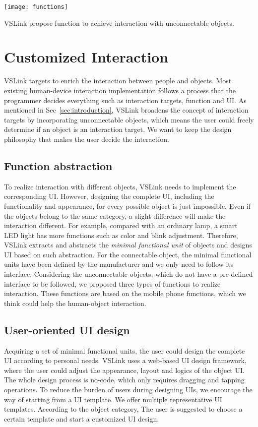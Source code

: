 \begin{table}[t]
	\centering
	\texttt{[image: functions]}
	\caption{VSLink propose function to achieve interaction with unconnectable objects.}
	\label{table:functions}
\end{table}

\section{Customized Interaction}\label{sec:flexible}
VSLink targets to enrich the interaction between people and objects.
Most existing human-device interaction implementation follows a process that the programmer decides everything such as interaction targets, function and UI.
As mentioned in Sec~\ref{sec:introduction}, VSLink broadens the concept of interaction targets by incorporating unconnectable objects, which means the user could freely determine if an object is an interaction target. 
We want to keep the design philosophy that makes the user decide the interaction.     

\subsection{Function abstraction}
To realize interaction with different objects, VSLink needs to implement the corresponding UI.  
However, designing the complete UI, including the functionality and appearance, for every possible object is just impossible.
Even if the objects belong to the same category, a slight difference will make the interaction different.
For example, compared with an ordinary lamp, a smart LED light has more functions such as color and blink adjustment.
Therefore, VSLink extracts and abstracts the \textit{minimal functional unit} of objects and designs UI based on such abstraction.
For the connectable object, the minimal functional units have been defined by the manufacturer and we only need to follow its interface.
Considering the unconnectable objects, which do not have a pre-defined interface to be followed, we proposed three types of functions to realize interaction.
These functions are based on the mobile phone functions, which we think could help the human-object interaction. 
% 
 
\subsection{User-oriented UI design}
Acquiring a set of minimal functional units, the user could design the complete UI according to personal needs.
VSLink uses a web-based UI design framework, where the user could adjust the appearance, layout and logics of the object UI.
The whole design process is no-code, which only requires dragging and tapping operations.
To reduce the burden of users during designing UIs, we encourage the way of starting from a UI template.
We offer multiple representative UI templates. According to the object category, The user is suggested to choose a certain template and start a customized UI design. 

